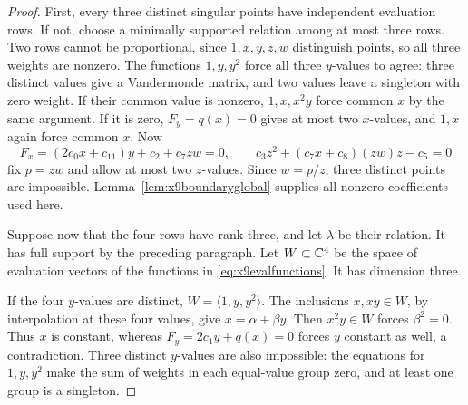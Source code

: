\begin{proof}
First, every three distinct singular points have independent evaluation
rows. If not, choose a minimally supported relation among at most three
rows. Two rows cannot be proportional, since $1,x,y,z,w$ distinguish
points, so all three weights are nonzero. The functions $1,y,y^2$ force
all three $y$-values to agree: three distinct values give a Vandermonde
matrix, and two values leave a singleton with zero weight. If their
common value is nonzero, $1,x,x^2y$ force common $x$ by the same argument.
If it is zero, $F_y=q(x)=0$ gives at most two $x$-values, and $1,x$ again
force common $x$. Now
\begin{equation}\label{eq:x9criticalpair}
 F_x=(2c_0x+c_{11})y+c_2+c_7zw=0,\qquad
 c_3z^2+(c_7x+c_8)(zw)z-c_5=0
\end{equation}
fix $p=zw$ and allow at most two $z$-values. Since $w=p/z$, three
distinct points are impossible. Lemma~\ref{lem:x9boundaryglobal}
supplies all nonzero coefficients used here.

Suppose now that the four rows have rank three, and let $\lambda$ be
their relation. It has full support by the preceding paragraph. Let
$W\subset\mathbb C^4$ be the space of evaluation vectors of the functions
in \eqref{eq:x9evalfunctions}. It has dimension three.

If the four $y$-values are distinct, $W=\langle1,y,y^2\rangle$.
The inclusions $x,xy\in W$, by interpolation at these four values,
give $x=\alpha+\beta y$. Then $x^2y\in W$ forces $\beta^2=0$.
Thus $x$ is constant, whereas $F_y=2c_1y+q(x)=0$ forces $y$ constant
as well, a contradiction. Three distinct $y$-values are also impossible:
the equations for $1,y,y^2$ make the sum of weights in each equal-value
group zero, and at least one group is a singleton.


\end{proof}

